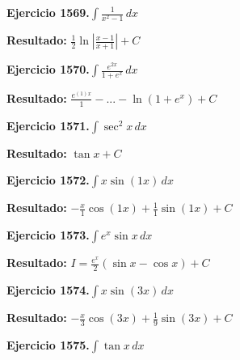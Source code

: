 \documentclass[10pt,a4paper]{article}
\begin{document}
\begin{ejbox}
\textbf{Ejercicio 1569.}\quad $\int \frac{1}{x^2-1}\,dx$
\end{ejbox}

\begin{solbox}
\textbf{Resultado:} \(\displaystyle \frac{1}{2}\ln\left|\frac{x-1}{x+1}\right| + C\)
\end{solbox}

\newpage
\begin{ejbox}
\textbf{Ejercicio 1570.}\quad $\int \frac{e^{2x}}{1+e^{x}}\,dx$
\end{ejbox}

\begin{solbox}
\textbf{Resultado:} \(\displaystyle \frac{e^{(1)x}}{1} - ... - \ln(1+e^x) + C\)
\end{solbox}

\begin{ejbox}
\textbf{Ejercicio 1571.}\quad $\int \sec^2 x\,dx$
\end{ejbox}

\begin{solbox}
\textbf{Resultado:} \(\displaystyle \tan x + C\)
\end{solbox}

\begin{ejbox}
\textbf{Ejercicio 1572.}\quad $\int x \sin(1x)\,dx$
\end{ejbox}

\begin{solbox}
\textbf{Resultado:} \(\displaystyle -\frac{x}{1}\cos(1x) + \frac{1}{1}\sin(1x) + C\)
\end{solbox}

\newpage
\begin{ejbox}
\textbf{Ejercicio 1573.}\quad $\int e^x\sin x\,dx$
\end{ejbox}

\begin{solbox}
\textbf{Resultado:} \(\displaystyle I = \frac{e^x}{2}(\sin x - \cos x) + C\)
\end{solbox}

\begin{ejbox}
\textbf{Ejercicio 1574.}\quad $\int x \sin(3x)\,dx$
\end{ejbox}

\begin{solbox}
\textbf{Resultado:} \(\displaystyle -\frac{x}{3}\cos(3x) + \frac{1}{9}\sin(3x) + C\)
\end{solbox}

\begin{ejbox}
\textbf{Ejercicio 1575.}\quad $\int \tan x\,dx$
\end{ejbox}
\end{document}

